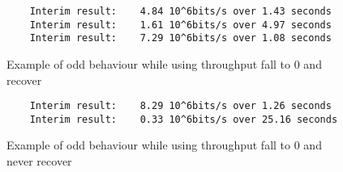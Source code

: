     \begin{figure}[bthp]
    \begin{lstlisting}
    Interim result:    4.84 10^6bits/s over 1.43 seconds
    Interim result:    1.61 10^6bits/s over 4.97 seconds
    Interim result:    7.29 10^6bits/s over 1.08 seconds
    \end{lstlisting}
    \caption{Example of odd behaviour while using \olsr\: throughput fall
      to 0 and recover}
    \label{lst:netperf-olsr-recover}
    \end{figure}

    \begin{figure}[bthp]
    \begin{lstlisting}
    Interim result:    8.29 10^6bits/s over 1.26 seconds
    Interim result:    0.33 10^6bits/s over 25.16 seconds
    \end{lstlisting}
    \caption{Example of odd behaviour while using \olsr\: throughput fall
      to 0 and never recover}
    \label{lst:netperf-olsr-zero}
    \end{figure}
